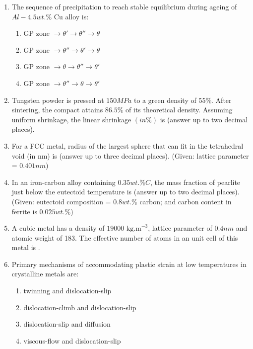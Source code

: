 \documentclass[journal]{IEEEtran}
\theoremstyle{remark}
\begin{document}
\begin{enumerate}
\item The sequence of precipitation to reach stable equilibrium during ageing of $Al-4.5 wt.\%$ Cu alloy is: \hfill{}
\begin{multicols}{2}
\begin{enumerate}
    \item GP zone $\rightarrow \theta' \rightarrow \theta'' \rightarrow \theta$
    \item GP zone $\rightarrow \theta'' \rightarrow \theta' \rightarrow \theta$
    \item GP zone $\rightarrow \theta \rightarrow \theta'' \rightarrow \theta'$
    \item GP zone $\rightarrow \theta'' \rightarrow \theta \rightarrow \theta'$
\end{enumerate}
\end{multicols}

\item Tungsten powder is pressed at $150 MPa$ to a green density of $55\%$. After sintering, the compact attains $86.5\%$ of its theoretical density. Assuming uniform shrinkage, the linear shrinkage $(in \%)$ is \underline {\hspace{2cm}} (answer up to two decimal places). \hfill{}

\item For a FCC metal, radius of the largest sphere that can fit in the tetrahedral void (in nm) is \underline {\hspace{2cm}} (answer up to three decimal places). (Given: lattice parameter = $0.401 nm$) \hfill{}

\item In an iron-carbon alloy containing $0.35 wt.\% C$, the mass fraction of pearlite just below the eutectoid temperature is \underline {\hspace{2cm}} (answer up to two decimal places). (Given: eutectoid composition = $0.8 wt.\%$ carbon; and carbon content in ferrite is $0.025 wt.\%$) \hfill{}

\item A cubic metal has a density of $19000 \text{ kg.m}^{-3}$, lattice parameter of $0.4 nm$ and atomic weight of 183. The effective number of atoms in an unit cell of this metal is \underline {\hspace{2cm}}. \hfill{}

\item Primary mechanisms of accommodating plastic strain at low temperatures in crystalline metals are: \hfill{}
\begin{multicols}{2}
\begin{enumerate}
    \item twinning and dislocation-slip
    \item dislocation-climb and dislocation-slip
    \item dislocation-slip and diffusion
    \item viscous-flow and dislocation-slip
\end{enumerate}
\end{multicols}


\end{enumerate}
\end{document}
